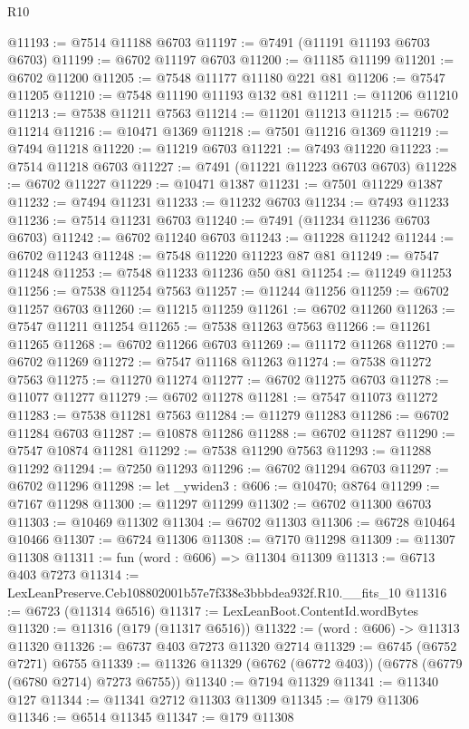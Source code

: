 \begin{lexlean}{R10}
\begin{coremodule}
@11193 := @7514 @11188 @6703
@11197 := @7491 (@11191 @11193 @6703 @6703)
@11199 := @6702 @11197 @6703
@11200 := @11185 @11199
@11201 := @6702 @11200
@11205 := @7548 @11177 @11180 @221 @81
@11206 := @7547 @11205
@11210 := @7548 @11190 @11193 @132 @81
@11211 := @11206 @11210
@11213 := @7538 @11211 @7563
@11214 := @11201 @11213
@11215 := @6702 @11214
@11216 := @10471 @1369
@11218 := @7501 @11216 @1369
@11219 := @7494 @11218
@11220 := @11219 @6703
@11221 := @7493 @11220
@11223 := @7514 @11218 @6703
@11227 := @7491 (@11221 @11223 @6703 @6703)
@11228 := @6702 @11227
@11229 := @10471 @1387
@11231 := @7501 @11229 @1387
@11232 := @7494 @11231
@11233 := @11232 @6703
@11234 := @7493 @11233
@11236 := @7514 @11231 @6703
@11240 := @7491 (@11234 @11236 @6703 @6703)
@11242 := @6702 @11240 @6703
@11243 := @11228 @11242
@11244 := @6702 @11243
@11248 := @7548 @11220 @11223 @87 @81
@11249 := @7547 @11248
@11253 := @7548 @11233 @11236 @50 @81
@11254 := @11249 @11253
@11256 := @7538 @11254 @7563
@11257 := @11244 @11256
@11259 := @6702 @11257 @6703
@11260 := @11215 @11259
@11261 := @6702 @11260
@11263 := @7547 @11211 @11254
@11265 := @7538 @11263 @7563
@11266 := @11261 @11265
@11268 := @6702 @11266 @6703
@11269 := @11172 @11268
@11270 := @6702 @11269
@11272 := @7547 @11168 @11263
@11274 := @7538 @11272 @7563
@11275 := @11270 @11274
@11277 := @6702 @11275 @6703
@11278 := @11077 @11277
@11279 := @6702 @11278
@11281 := @7547 @11073 @11272
@11283 := @7538 @11281 @7563
@11284 := @11279 @11283
@11286 := @6702 @11284 @6703
@11287 := @10878 @11286
@11288 := @6702 @11287
@11290 := @7547 @10874 @11281
@11292 := @7538 @11290 @7563
@11293 := @11288 @11292
@11294 := @7250 @11293
@11296 := @6702 @11294 @6703
@11297 := @6702 @11296
@11298 := let _ywiden3 : @606 := @10470; @8764
@11299 := @7167 @11298
@11300 := @11297 @11299
@11302 := @6702 @11300 @6703
@11303 := @10469 @11302
@11304 := @6702 @11303
@11306 := @6728 @10464 @10466
@11307 := @6724 @11306
@11308 := @7170 @11298
@11309 := @11307 @11308
@11311 := fun (word : @606) => @11304 @11309
@11313 := @6713 @403 @7273
@11314 := LexLeanPreserve.Ceb108802001b57e7f338e3bbbdea932f.R10.__fits_10
@11316 := @6723 (@11314 @6516)
@11317 := LexLeanBoot.ContentId.wordBytes
@11320 := @11316 (@179 (@11317 @6516))
@11322 := (word : @606) -> @11313 @11320
@11326 := @6737 @403 @7273 @11320 @2714
@11329 := @6745 (@6752 @7271) @6755
@11339 := @11326 @11329 (@6762 (@6772 @403)) (@6778 (@6779 (@6780 @2714) @7273 @6755))
@11340 := @7194 @11329
@11341 := @11340 @127
@11344 := @11341 @2712 @11303 @11309
@11345 := @179 @11306
@11346 := @6514 @11345
@11347 := @179 @11308

\end{coremodule}
\end{lexlean}
